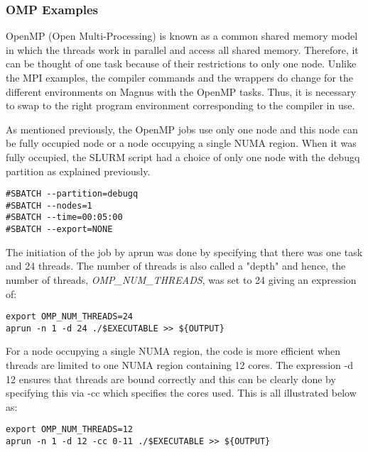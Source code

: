\subsubsection{OMP Examples}

OpenMP (Open Multi-Processing) is known as a common shared memory model in which the threads work in parallel and access all shared memory. Therefore,
it can be thought of one task because of their restrictions to only one node. Unlike the MPI examples, the compiler commands and the wrappers do change 
for the different environments on Magnus with the OpenMP tasks. Thus, it is necessary to swap to the right program environment corresponding to the 
compiler in use.

As mentioned previously, the OpenMP jobs use only one node and this node can be fully occupied node or a node occupying a single NUMA region. When it was 
fully occupied, the SLURM script had a choice of only one node with the debugq partition as explained previously.

\begin{tcolorbox}
\begin{Verbatim}[fontsize=\scriptsize]
#SBATCH --partition=debugq
#SBATCH --nodes=1
#SBATCH --time=00:05:00
#SBATCH --export=NONE
\end{Verbatim}
\end{tcolorbox}

The initiation of the job by aprun was done by specifying that there was one task and 24 threads. The number of threads is also called a "depth" and 
hence, the number of threads, \emph{OMP\_NUM\_THREADS}, was set to 24 giving an expression of:

\begin{tcolorbox}
\begin{Verbatim}[fontsize=\scriptsize]
export OMP_NUM_THREADS=24
aprun -n 1 -d 24 ./$EXECUTABLE >> ${OUTPUT}
\end{Verbatim}
\end{tcolorbox}

For a node occupying a single NUMA region, the code is more efficient when threads are limited to one NUMA region containing 12 cores. The expression 
-d 12 ensures that threads are bound correctly and this can be clearly done by specifying this via -cc which specifies the cores used. This is all 
illustrated below as:

\begin{tcolorbox}
\begin{Verbatim}[fontsize=\scriptsize]
export OMP_NUM_THREADS=12
aprun -n 1 -d 12 -cc 0-11 ./$EXECUTABLE >> ${OUTPUT}
\end{Verbatim}
\end{tcolorbox}

